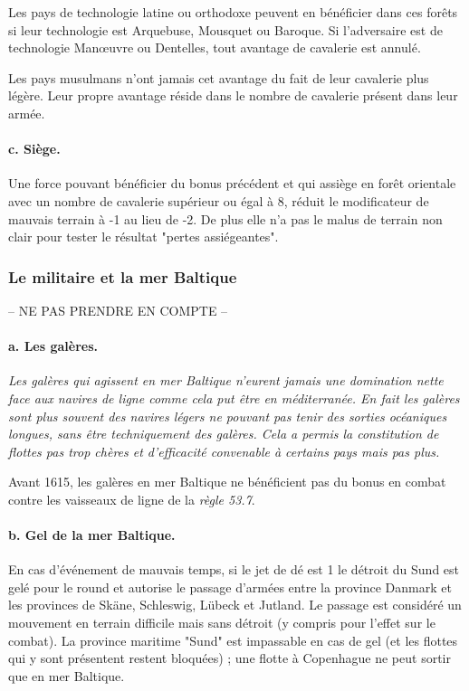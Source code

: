 Les pays de technologie latine ou orthodoxe peuvent  en bénéficier dans ces forêts si
leur technologie est Arquebuse, Mousquet ou Baroque.
Si l'adversaire est de technologie Man\oe uvre ou Dentelles, tout avantage
de cavalerie est annulé.

Les pays musulmans n'ont jamais cet avantage du fait de leur cavalerie
plus légère. Leur propre avantage réside dans le nombre de cavalerie
présent dans leur armée.

\paragraph{c. Siège.}
Une force pouvant bénéficier du bonus précédent et
qui assiège en forêt orientale avec un nombre
de cavalerie supérieur ou égal à 8,
réduit le modificateur de mauvais terrain à -1 au lieu de -2.
De plus elle n'a pas le malus de terrain non clair pour
tester le résultat "pertes assiégeantes".

\subsubsection{Le militaire et la mer Baltique}
-- NE PAS PRENDRE EN COMPTE --


\paragraph{a. Les galères.}
\textit{
Les galères qui agissent en mer Baltique n'eurent jamais une domination
nette face aux navires de ligne comme cela put être en méditerranée.
En fait les galères sont plus souvent des navires légers ne pouvant pas
tenir des sorties océaniques longues, sans être techniquement des galères.
Cela a permis la constitution de flottes pas trop chères et d'efficacité
convenable à certains pays mais pas plus.}

Avant 1615, les galères en mer Baltique ne bénéficient pas du bonus en combat
contre les vaisseaux de ligne de la \textit{règle 53.7}.

\paragraph{b. Gel de la mer Baltique.}
En cas d'événement de mauvais temps, si le jet de dé est 1 le détroit du Sund est
gelé pour le round et autorise le passage d'armées entre la province Danmark et
les provinces de Skäne, Schleswig,
Lübeck et Jutland. Le passage est considéré un mouvement en terrain difficile mais
sans détroit (y compris pour l'effet sur le combat).
La province maritime "Sund" est impassable en cas de gel
(et les flottes qui y sont présentent restent bloquées) ;
une flotte à Copenhague ne peut sortir que en mer Baltique.


